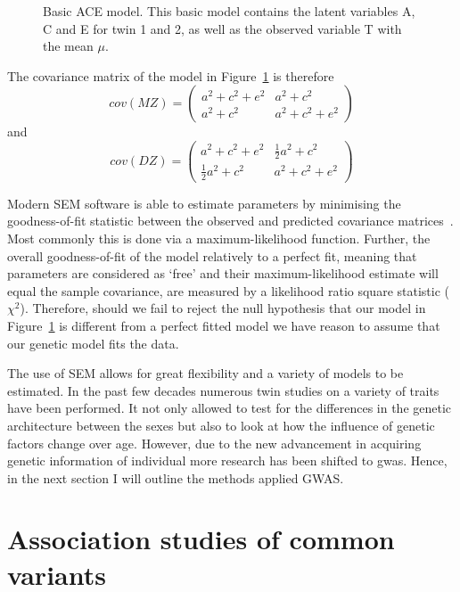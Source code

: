\documentclass[../header.tex]{subfiles}
\begin{document}
\begin{figure}[htpb]
  \centering
  \scalebox{0.6}{}
  \caption{
    Basic ACE model.
    This basic model contains the latent variables A, C and E for twin 1 and 2, as well as the observed variable T with the mean $\mu$.
  }\label{fig:ace}
\end{figure}

The covariance matrix of the model in Figure~\ref{fig:ace} is therefore
\begin{equation}
  cov(MZ) = 
  \begin{pmatrix}
    a^2 + c^2 + e^2 & a^2 + c^2 \\
    a^2 + c^2 & a^2 + c^2 + e^2
  \end{pmatrix}
\end{equation}
and 
\begin{equation}
  cov(DZ) = 
  \begin{pmatrix}
    a^2 + c^2 + e^2 & \frac{1}{2}a^2 + c^2 \\
    \frac{1}{2}a^2 + c^2 & a^2 + c^2 + e^2
  \end{pmatrix}
\end{equation}

Modern SEM software is able to estimate parameters by minimising the goodness-of-fit statistic between the observed and predicted covariance matrices~\cite{Boker2011}.
Most commonly this is done via a maximum-likelihood function.
Further, the overall goodness-of-fit of the model relatively to a perfect fit, meaning that parameters are considered as `free' and their maximum-likelihood estimate will equal the sample covariance, are measured by a likelihood ratio square statistic ($\chi^2$).
Therefore, should we fail to reject the null hypothesis that our model in Figure~\ref{fig:ace} is different from a perfect fitted model we have reason to assume that our genetic model fits the data.

The use of SEM allows for great flexibility and a variety of models to be estimated.
In the past few decades numerous twin studies on a variety of traits have been performed.
It not only allowed to test for the differences in the genetic architecture between the sexes but also to look at how the influence of genetic factors change over age.
However, due to the new advancement in acquiring genetic information of individual more research has been shifted to \acrfull{gwas}.
Hence, in the next section I will outline the methods applied GWAS\@.

\section{Association studies of common variants}
\label{sec:association_studies_of_common_variants}
\end{document}
